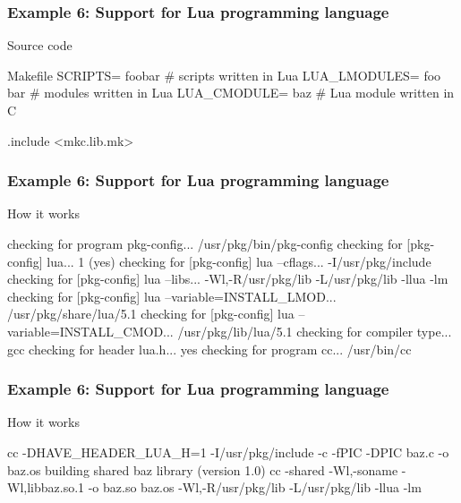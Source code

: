 \documentclass[hyperref={colorlinks=true}]{beamer}
\begin{document}
\begin{frame}[fragile]
  \frametitle{Example 6: Support for Lua programming language}

  \begin{block}{Source code}
  \begin{Code}{Makefile}
SCRIPTS=       foobar  # scripts written in Lua
LUA\_LMODULES=  foo bar # modules written in Lua
LUA\_CMODULE=   baz     # Lua module written in C

.include <mkc.lib.mk>
  \end{Code}
  \end{block}
\end{frame}

\begin{frame}[fragile]
  \frametitle{Example 6: Support for Lua programming language}

  \begin{block}{How it works}
  \begin{CodeNoLabel}
checking for program pkg-config...
   /usr/pkg/bin/pkg-config
checking for [pkg-config] lua... 1 (yes)
checking for [pkg-config] lua --cflags...
   -I/usr/pkg/include
checking for [pkg-config] lua --libs...
   -Wl,-R/usr/pkg/lib -L/usr/pkg/lib -llua -lm
checking for [pkg-config] lua --variable=INSTALL_LMOD...
   /usr/pkg/share/lua/5.1
checking for [pkg-config] lua --variable=INSTALL_CMOD...
   /usr/pkg/lib/lua/5.1
checking for compiler type... gcc
checking for header lua.h... yes
checking for program cc... /usr/bin/cc
\prompt{\$}
  \end{CodeNoLabel}
  \end{block}
\end{frame}

\begin{frame}[fragile]
  \frametitle{Example 6: Support for Lua programming language}

  \begin{block}{How it works}
  \begin{CodeNoLabel}
cc -DHAVE_HEADER_LUA_H=1 -I/usr/pkg/include
   -c -fPIC -DPIC baz.c -o baz.os
building shared baz library (version 1.0)
cc -shared -Wl,-soname -Wl,libbaz.so.1 -o baz.so  baz.os
   -Wl,-R/usr/pkg/lib -L/usr/pkg/lib -llua -lm
\prompt{\$}
  \end{CodeNoLabel}
  \end{block}
\end{frame}
\end{document}
